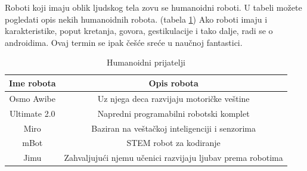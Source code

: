 \documentclass[a4paper]{article}
\begin{document}
Roboti koji imaju oblik ljudskog tela zovu se humanoidni roboti. U tabeli možete pogledati opis nekih humanoidnih robota. (tabela \ref{tab:tabela1}) Ako roboti imaju i karakteristike, poput kretanja, govora, gestikulacije i tako dalje, radi se o androidima. Ovaj termin se ipak češće sreće u naučnoj fantastici.

\begin{table}[ht!]
\begin{center}
\caption{Humanoidni prijatelji}
\begin{tabular}{|c|c|} \hline
Ime robota& Opis robota\\ \hline
Osmo Awibe &Uz njega deca razvijaju motoričke veštine\\ \hline
Ultimate 2.0 &Napredni programabilni robotski komplet\\ \hline
Miro &Baziran na veštačkoj inteligenciji i senzorima\\ \hline
mBot &STEM robot za kodiranje\\ \hline
Jimu &Zahvaljujući njemu učenici razvijaju ljubav prema robotima\\ \hline
\end{tabular}
\label{tab:tabela1}
\end{center}
\end{table}
\end{document}
